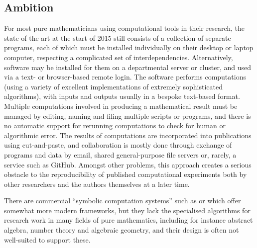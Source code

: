 
\subsection{Ambition}



For most pure mathematicians using computational tools in their
research, the state of the art at the start of 2015 still consists of
a collection of
separate programs, each of which must be installed individually on their
desktop or laptop computer, respecting a complicated set of interdependencies.
Alternatively, software may be installed for them on a
departmental server or cluster, and used via a text- or browser-based remote
login. The software performs computations (using a variety of excellent
implementations of extremely sophisticated algorithms), with inputs and
outputs usually in a bespoke text-based format.
Multiple computations involved in producing a mathematical
result must be managed by editing, naming and filing multiple scripts
or programs, and there is no automatic support for rerunning
computations to check for human or algorithmic error. The results of
computations are incorporated into publications using cut-and-paste, and
collaboration is mostly done through exchange of programs and data by email,
shared general-purpose file servers or, rarely, a service such as
GitHub. Amongst other problems,  this approach creates a serious
obstacle to the reproducibility
of published computational experiments both by other researchers and
the authors themselves at a later time.

There are commercial ``symbolic computation systems'' such as
\Mathematica or \Maple which offer somewhat more modern frameworks, but
they lack the specialised algorithms for research work in many fields
of pure mathematics, including for instance
abstract algebra, number theory and algebraic geometry, and their
design is often not well-suited to support these.


